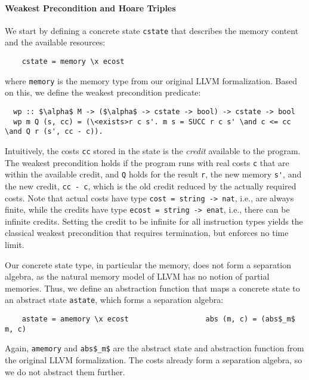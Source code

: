 \documentclass[acmsmall]{acmart}
\newcommand{\is}{\lstinline[language=isabelle]}
\begin{document}









\paragraph{Weakest Precondition and Hoare Triples}
We start by defining a concrete state \is{cstate} that describes the memory content and the available resources:
\begin{lstlisting}
    cstate = memory \x ecost   
\end{lstlisting}
where \is{memory} is the memory type from our original LLVM formalization.
Based on this, we define the weakest precondition predicate:
\begin{lstlisting}
  wp :: $\alpha$ M -> ($\alpha$ -> cstate -> bool) -> cstate -> bool
  wp m Q (s, cc) = (\<exists>r c s'. m s = SUCC r c s' \and c <= cc \and Q r (s', cc - c)).
\end{lstlisting}
Intuitively, the costs \is$cc$ stored in the state is the \emph{credit} available to the program.
The weakest precondition holds if the program runs with real costs \is$c$ that are within the available credit, and \is$Q$ holds for the result \is{r}, the new memory \is{s'}, 
and the new credit, \is{cc - c}, which is the old credit reduced by the actually required costs.
Note that actual costs have type \is{cost = string -> nat}, i.e., are always finite, while the credits have type \is{ecost = string -> enat}, i.e., there can be infinite credits. 
Setting the credit to be infinite for all instruction types yields the classical weakest precondition that requires termination, but enforces no time limit. 


Our concrete state type, in particular the memory, does not form a separation algebra, as the natural memory model of LLVM has no notion of partial memories. Thus, we define an abstraction function
that maps a concrete state to an abstract state \is{astate}, which forms a separation algebra:
\begin{lstlisting}
    astate = amemory \x ecost                  abs (m, c) = (abs$_m$ m, c)
\end{lstlisting}
Again, \is{amemory} and \is{abs$_m$} are the abstract state and abstraction function from the original LLVM formalization. The costs already form a separation algebra, so we do not abstract them further.
\end{document}
